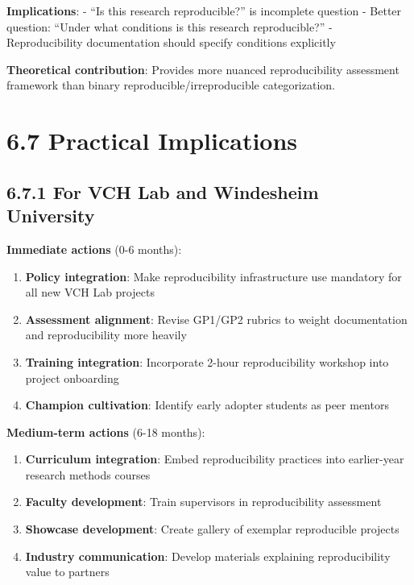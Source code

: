 \documentclass[
  oneside,
  open=any]{scrbook}
\providecommand{\tightlist}{%
  \setlength{\itemsep}{0pt}\setlength{\parskip}{0pt}}\usepackage{longtable,booktabs,array}
\begin{document}
\textbf{Implications}: - ``Is this research reproducible?'' is
incomplete question - Better question: ``Under what conditions is this
research reproducible?'' - Reproducibility documentation should specify
conditions explicitly

\textbf{Theoretical contribution}: Provides more nuanced reproducibility
assessment framework than binary reproducible/irreproducible
categorization.

\section{6.7 Practical Implications}\label{practical-implications}

\subsection{6.7.1 For VCH Lab and Windesheim
University}\label{for-vch-lab-and-windesheim-university}

\textbf{Immediate actions} (0-6 months):

\begin{enumerate}
\def\labelenumi{\arabic{enumi}.}
\tightlist
\item
  \textbf{Policy integration}: Make reproducibility infrastructure use
  mandatory for all new VCH Lab projects
\item
  \textbf{Assessment alignment}: Revise GP1/GP2 rubrics to weight
  documentation and reproducibility more heavily
\item
  \textbf{Training integration}: Incorporate 2-hour reproducibility
  workshop into project onboarding
\item
  \textbf{Champion cultivation}: Identify early adopter students as peer
  mentors
\end{enumerate}

\textbf{Medium-term actions} (6-18 months):

\begin{enumerate}
\def\labelenumi{\arabic{enumi}.}
\tightlist
\item
  \textbf{Curriculum integration}: Embed reproducibility practices into
  earlier-year research methods courses
\item
  \textbf{Faculty development}: Train supervisors in reproducibility
  assessment
\item
  \textbf{Showcase development}: Create gallery of exemplar reproducible
  projects
\item
  \textbf{Industry communication}: Develop materials explaining
  reproducibility value to partners
\end{enumerate}
\end{document}

